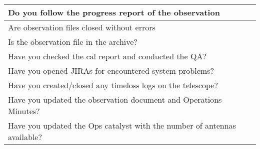 \begin{itemize}
\begin{table}[H]
\begin{tabular}[b]{|p{16 cm}|}
	Do you follow the progress report of the observation\\
	\hline
	Are observation files closed without errors\\
	\hline
	Is the observation file in the archive?\\
	\hline
	Have you checked the cal report and conducted the QA?\\
	\hline
	Have you opened JIRAs for encountered system problems?\\
	\hline
	Have you created/closed any timeloss logs on the telescope?\\
	\hline
	Have you updated the observation document and Operations Minutes?\\
	\hline
	
	
	Have you updated the Ops catalyst with the number of antennas available?\\
	\hline
		
	\end{tabular}
\end{table}
\end{itemize}
